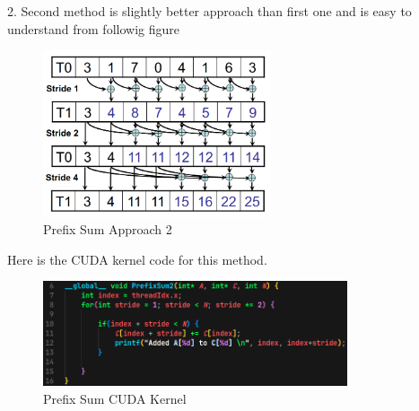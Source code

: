 \documentclass{article}
\begin{document}
2. Second method is slightly better approach than first one and is easy to understand from followig figure

\begin{figure}[h]
    \centering
    \includegraphics[width=0.6\textwidth]{Images/prefix2method.png}
    \caption{Prefix Sum Approach 2}
\end{figure}

Here is the CUDA kernel code for this method.

\begin{figure}[h]
    \centering
    \includegraphics[width=0.8\textwidth]{Images/prefix2.png}
    \caption{Prefix Sum CUDA Kernel}
\end{figure}
\end{document}
